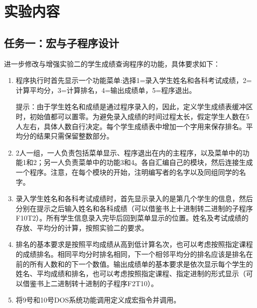 \documentclass{article}
\begin{document}
	\section{实验内容}

	\subsection[任务一]{任务一：宏与子程序设计}
	\noindent 进一步修改与增强实验二的学生成绩查询程序的功能，具体要求如下： \par
	\begin{enumerate}
		\item 程序执行时首先显示一个功能菜单:选择1=录入学生姓名和各科考试成绩，2=计算平均分，3=计算排名，4=输出成绩单，5=程序退出。 \par
			提示：由于学生姓名和成绩是通过程序录入的，因此，定义学生成绩表缓冲区时，初始值都可以置零。为避免录入成绩的时间过程太长，假定学生人数在5人左右，具体人数自行决定。每个学生成绩表中增加一个字用来保存排名。平均分的结果只需保留整数部分。
		\item 2人一组，一人负责包括菜单显示、程序退出在内的主程序，以及菜单中的功能1和2；另一人负责菜单中的功能3和4。各自汇编自己的模块，然后连接生成一个程序。注意，在每个模块的开始，注明编写者的名字以及同组同学的名字。
		\item 录入学生姓名和各科考试成绩时，首先显示录入的是第几个学生的信息，然后分别在提示之后输入姓名和各科成绩（可以借鉴书上十进制转二进制的子程序F10T2）。所有学生信息录入完毕后回到菜单显示的位置。姓名及考试成绩的存放、平均分的计算，按照实验二的要求。
		\item 排名的基本要求是按照平均成绩从高到低计算名次，也可以考虑按照指定课程的成绩排名。相同平均分时排名相同，下一个相邻平均分的排名应该是排名在前的所有人数和的下一个数值。输出成绩单的基本要求是依次显示每个学生的姓名、平均成绩和排名，也可以考虑按照指定课程、指定进制的形式显示（可以借鉴书上二进制转十进制的子程序F2T10）。
		\item 将9号和10号DOS系统功能调用定义成宏指令并调用。
	\end{enumerate}
\end{document}
